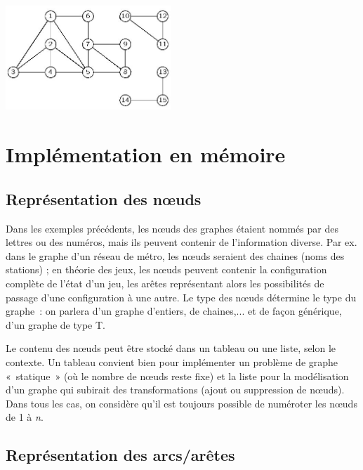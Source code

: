		\begin{center}
		\includegraphics[width=6.235cm,height=3.955cm]{image/a2012Logique2eme-img048.jpg}
		\end{center}



\section{Implémentation en mémoire}

	\subsection{Représentation des n{\oe}uds}
				
		Dans les exemples précédents, les n{\oe}uds des graphes étaient 
		nommés par des lettres ou des numéros, mais ils peuvent
		contenir de l'information diverse. Par ex. dans le graphe 
		d'un réseau de métro, les n{\oe}uds seraient des chaines
		(noms des stations) ; en théorie des jeux, les n{\oe}uds 
		peuvent contenir la configuration complète de l'état d'un jeu,
		les arêtes représentant alors les possibilités de passage 
		d'une configuration à une autre. Le type des n{\oe}uds
		détermine le type du graphe~: on parlera d'un graphe d'entiers, 
		de chaines,... et de façon générique, d'un graphe de type T.

		Le contenu des n{\oe}uds peut être stocké dans un tableau ou une 
		liste, selon le contexte. Un tableau convient bien pour
		implémenter un problème de graphe «~statique~» (où le nombre 
		de n{\oe}uds reste fixe) et la liste pour la modélisation
		d'un graphe qui subirait des transformations (ajout ou 
		suppression de n{\oe}uds). Dans tous les cas, on considère qu'il
		est toujours possible de numéroter les n{\oe}uds de 1 à \textit{n}.

	\subsection{Représentation des arcs/arêtes}
				
